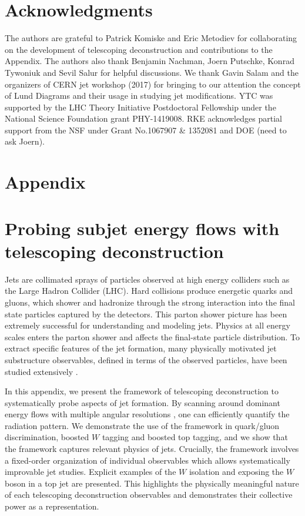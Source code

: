 \documentclass[notoc]{JHEP3}
\begin{document}
\section*{Acknowledgments}
The authors are grateful to Patrick Komiske and Eric Metodiev for collaborating on the development of telescoping deconstruction and contributions to the Appendix. The authors also thank Benjamin Nachman, Joern Putschke, Konrad Tywoniuk and Sevil Salur for helpful discussions. We thank Gavin Salam and the organizers of CERN jet workshop (2017) for bringing to our attention the concept of Lund Diagrams and their usage in studying jet modifications. YTC was supported by the LHC Theory Initiative Postdoctoral Fellowship under the National Science Foundation grant PHY-1419008. RKE acknowledges partial support from the NSF under Grant No.1067907 \& 1352081 and DOE (need to ask Joern).










\newpage
\appendix
\section*{Appendix}
\section{Probing subjet energy flows with telescoping deconstruction}

Jets are collimated sprays of particles observed at high energy colliders such as the Large Hadron Collider (LHC). Hard collisions produce energetic quarks and gluons, which shower and hadronize through the strong interaction into the final state particles captured by the detectors. This parton shower picture has been extremely successful for understanding and modeling jets. Physics at all energy scales enters the parton shower and affects the final-state particle distribution. To extract specific features of the jet formation, many physically motivated jet substructure observables, defined in terms of the observed particles, have been studied extensively \cite{Abdesselam:2010pt,Altheimer:2012mn,Altheimer:2013yza,Adams:2015hiv,Larkoski:2017jix,ATLAS-CONF-2017-064,Khachatryan:1955546}.

In this appendix, we present the framework of telescoping deconstruction to systematically probe aspects of jet formation. By scanning around dominant energy flows with multiple angular resolutions \cite{Chien:2013kca,Chien:2014hla}, one can efficiently quantify the radiation pattern. We demonstrate the use of the framework in quark/gluon discrimination, boosted $W$ tagging and boosted top tagging, and we show that the framework captures relevant physics of jets. Crucially, the framework involves a fixed-order organization of individual observables which allows systematically improvable jet studies. Explicit examples of the $W$ isolation \cite{Chien:2017xrb} and exposing the $W$ boson in a top jet are presented. This highlights the physically meaningful nature of each telescoping deconstruction observables and demonstrates their collective power as a representation.
\end{document}
